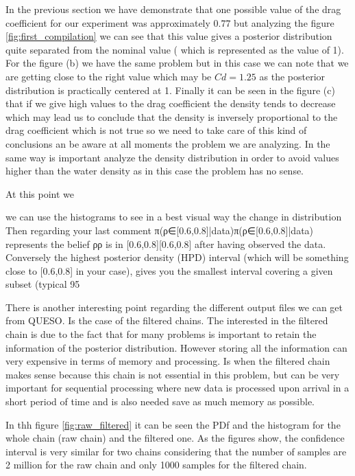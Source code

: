 \documentclass{article}
\begin{document}
In the previous section we have demonstrate that one possible value of the drag coefficient for our experiment was approximately $0.77$ but analyzing the figure \ref{fig:first_compilation} we can see that this value gives a posterior distribution quite  separated from the nominal value ( which is represented as the value of 1). For the figure (b) we have the same problem but in this case we can note that we are getting close to the right value which may be $Cd=1.25$ as the posterior distribution is practically centered at 1. Finally it can be seen in the figure (c) that if we give high values to the drag coefficient the density tends to decrease which may lead us to conclude that the density is inversely  proportional to the drag coefficient which is not true so we need to take care of this kind of conclusions an be aware at all moments the problem we are analyzing. In the same way is important analyze the density distribution in order to avoid values higher than the water density as in this case the problem has no sense.
 \par \noindent
 At this point we 
 

we can use the histograms to see in a best visual way the change in distribution
Then regarding your last comment π(ρ∈[0.6,0.8]|data)π(ρ∈[0.6,0.8]|data) represents the belief ρρ is in [0.6,0.8][0.6,0.8] after having observed the data. Conversely the highest posterior density (HPD) interval (which will be something close to [0.6,0.8] in your case), gives you the smallest interval covering a given subset (typical 95%

There is another interesting point regarding the different output files we can get  from QUESO. Is the case of the filtered chains. The interested in the filtered chain is due to the fact that for many problems is important to retain the information of the posterior distribution. However storing all the information can  very expensive in terms of memory and processing. Is when the filtered chain makes sense because this chain is not  essential in this problem, but can be very important for sequential processing where new data is processed upon arrival in a short period of time and is also needed save as much memory as possible.
 \par \noindent
In thh figure \ref{fig:raw_filtered} it can be seen the PDf and the histogram for the whole chain (raw chain) and the filtered one. As the figures show, the confidence interval is very similar for two chains considering that the number of samples are 2 million for the raw chain and only 1000 samples for the filtered chain.
\end{document}

